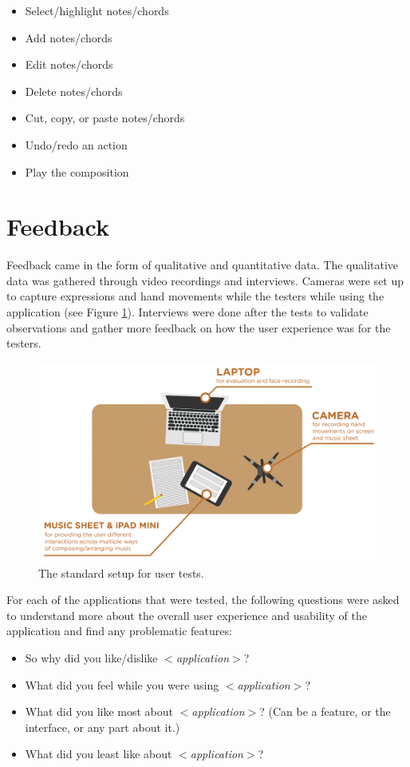 				\begin{itemize}
					\item Select/highlight notes/chords
				  	\item Add notes/chords
				  	\item Edit notes/chords
				  	\item Delete notes/chords
				  	\item Cut, copy, or paste notes/chords
				  	\item Undo/redo an action
				  	\item Play the composition
				\end{itemize}


	\section{Feedback}

		Feedback came in the form of qualitative and quantitative data. The qualitative data was gathered through video recordings and interviews. Cameras were set up to capture expressions and hand movements while the testers while using the application (see Figure \ref{fig:test_setup}). Interviews were done after the tests to validate observations and gather more feedback on how the user experience was for the testers. 

		\begin{figure}[H]
			\centering
			\includegraphics[scale=0.23]{figures/test_setup.png}
		    \caption{The standard setup for user tests.}
		    \label{fig:test_setup}
		\end{figure} 

		For each of the applications that were tested, the following questions were asked to understand more about the overall user experience and usability of the application and find any problematic features: 
		\begin{itemize}
			\item So why did you like/dislike \textit{$<$application$>$}?
			\item What did you feel while you were using \textit{$<$application$>$}? 
			\item What did you like most about \textit{$<$application$>$}? (Can be a feature, or the interface, or any part about it.)
			\item What did you least like about \textit{$<$application$>$}?
		\end{itemize} 
		
